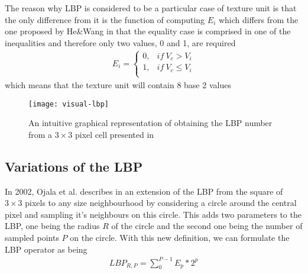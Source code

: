 The reason why LBP is considered to be a particular case of texture unit is that the only difference from it is the function of computing $E_i$ which differs from the one proposed by He\&Wang in that the equality case is comprised in one of the inequalities and therefore only two values, 0 and 1, are required
\begin{align}
E_i = \begin{cases}
0, & if\ V_c > V_i \\
1, & if\ V_c \leq V_i \\
\end{cases}
\end{align}
which means that the texture unit will contain 8 base 2 values

\begin{figure}[H]
	\begin{center}
		\texttt{[image: visual-lbp]}
		\caption[Visual representation of \textbf{LBP} computation]{An intuitive graphical representation of obtaining the LBP number from a $3\times3$ pixel cell presented in \cite{lu2014divided}}
	\end{center}
\end{figure}

\subsection{Variations of the LBP}
In 2002, Ojala et al. describes in \cite{OjalaPM02} an extension of the LBP from the square of $3\times3$ pixels to any size neighbourhood by considering a circle around the central pixel and sampling it's neighbours on this circle. This adds two parameters to the LBP, one being the radius $R$ of the circle and the second one being the number of sampled points $P$ on the circle.  With this new definition, we can formulate the LBP operator as being
\begin{align}
	LBP_{R,P} = \sum_{0}^{P-1}E_p*2^p
\end{align}

